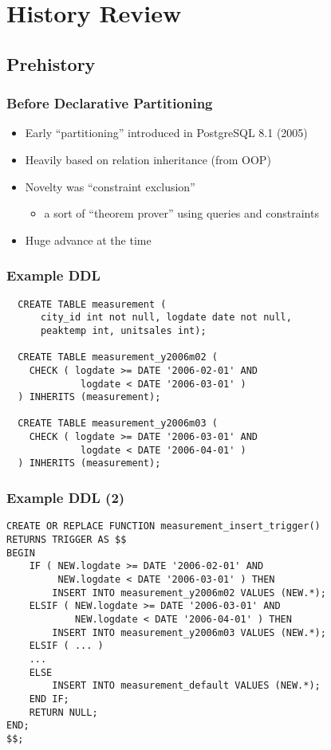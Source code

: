\section{History Review}
\subsection{Prehistory}
\begin{frame}
  \frametitle{Before Declarative Partitioning}
  \begin{itemize}
    \item Early ``partitioning'' introduced in PostgreSQL 8.1 (2005)
    \item Heavily based on relation inheritance (from OOP)
    \item Novelty was ``constraint exclusion''
      \begin{itemize}
	\item a sort of ``theorem prover'' using queries and constraints
      \end{itemize}
    \item Huge advance at the time
  \end{itemize}
\end{frame}

\begin{frame}[fragile]
  \frametitle{Example DDL}

\footnotesize
\begin{lstlisting}
  CREATE TABLE measurement (
      city_id int not null, logdate date not null,
      peaktemp int, unitsales int);

  CREATE TABLE measurement_y2006m02 (
    CHECK ( logdate >= DATE '2006-02-01' AND
             logdate < DATE '2006-03-01' )
  ) INHERITS (measurement);

  CREATE TABLE measurement_y2006m03 (
    CHECK ( logdate >= DATE '2006-03-01' AND
             logdate < DATE '2006-04-01' )
  ) INHERITS (measurement);
\end{lstlisting}
\end{frame}

\begin{frame}[fragile]
  \frametitle{Example DDL (2)}

\footnotesize
\begin{lstlisting}
CREATE OR REPLACE FUNCTION measurement_insert_trigger()
RETURNS TRIGGER AS $$
BEGIN
    IF ( NEW.logdate >= DATE '2006-02-01' AND
         NEW.logdate < DATE '2006-03-01' ) THEN
        INSERT INTO measurement_y2006m02 VALUES (NEW.*);
    ELSIF ( NEW.logdate >= DATE '2006-03-01' AND
            NEW.logdate < DATE '2006-04-01' ) THEN
        INSERT INTO measurement_y2006m03 VALUES (NEW.*);
    ELSIF ( ... )
	...
    ELSE
        INSERT INTO measurement_default VALUES (NEW.*);
    END IF;
    RETURN NULL;
END;
$$;

\end{lstlisting}
\end{frame}

